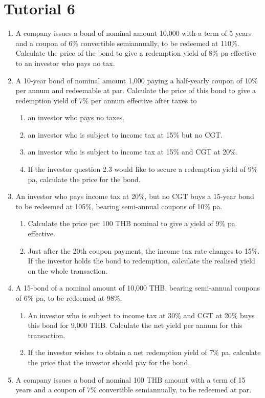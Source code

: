 \documentclass[
]{book}
\theoremstyle{definition}
\theoremstyle{definition}
\theoremstyle{definition}
\theoremstyle{definition}
\theoremstyle{remark}
\begin{document}
\section{Tutorial 6}\label{tutorial-6}

\begin{enumerate}
\def\labelenumi{\arabic{enumi}.}
\item
  A company issues a bond of nominal amount 10,000 with a term of 5
  years and a coupon of 6\% convertible semiannually, to be redeemed at
  110\%. Calculate the price of the bond to give a redemption yield of
  8\% pa effective to an investor who pays no tax.
\item
  A 10-year bond of nominal amount 1,000 paying a half-yearly coupon of
  10\% per annum and redeemable at par. Calculate the price of this
  bond to give a redemption yield of 7\% per annum effective after
  taxes to

  \begin{enumerate}
  \def\labelenumii{\arabic{enumii}.}
  \item
    an investor who pays no taxes.
  \item
    an investor who is subject to income tax at 15\% but no CGT.
  \item
    an investor who is subject to
    income tax at 15\% and CGT at 20\%.
  \item
    If the investor question 2.3 would like to secure a redemption yield of 9\%
    pa, calculate the price for the bond.
  \end{enumerate}
\item
  An investor who pays income tax at 20\%, but no CGT buys a 15-year
  bond to be redeemed at 105\%, bearing semi-annual coupons of 10\% pa.

  \begin{enumerate}
  \def\labelenumii{\arabic{enumii}.}
  \item
    Calculate the price per 100 THB nominal to give a yield of 9\% pa
    effective.
  \item
    Just after the 20th coupon payment, the income tax rate changes
    to 15\%. If the investor holds the bond to redemption, calculate
    the realised yield on the whole transaction.
  \end{enumerate}
\item
  A 15-bond of a nominal amount of 10,000 THB, bearing semi-annual coupons
  of 6\% pa, to be redeemed at 98\%.

  \begin{enumerate}
  \def\labelenumii{\arabic{enumii}.}
  \item
    An investor who is subject to income tax at 30\% and CGT at 20\%
    buys this bond for 9,000 THB. Calculate the net yield per annum for
    this transaction.
  \item
    If the investor wishes to obtain a net redemption yield of 7\%
    pa, calculate the price that the investor should pay for the
    bond.
  \end{enumerate}
\item
  A company issues a bond of nominal 100 THB amount with a term of 15 years
  and a coupon of 7\% convertible semiannually, to be redeemed at par.


\end{enumerate}
\end{document}
